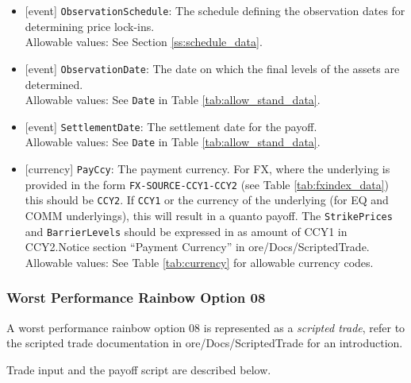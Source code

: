 \begin{itemize}
  Allowable values: See Section \ref{ss:schedule_data} ScheduleData.
  \item{}[event] \lstinline!ObservationSchedule!: The schedule defining the observation dates for determining price lock-ins. \\
  Allowable values: See Section \ref{ss:schedule_data}.
  \item{}[event] \lstinline!ObservationDate!: The date on which the final levels of the assets are determined. \\
  Allowable values: See \lstinline!Date! in Table \ref{tab:allow_stand_data}.
  \item{}[event] \lstinline!SettlementDate!: The settlement date for the payoff. \\
  Allowable values: See \lstinline!Date! in Table \ref{tab:allow_stand_data}.
  \item{}[currency] \lstinline!PayCcy!: The payment currency. For FX, where the underlying is provided
      in the form \lstinline!FX-SOURCE-CCY1-CCY2! (see Table \ref{tab:fxindex_data}) this should
      be \lstinline!CCY2!. If \lstinline!CCY1! or the currency of the underlying (for EQ and
      COMM underlyings), this will result in a quanto payoff. The \lstinline!StrikePrices! and \lstinline!BarrierLevels! should be expressed in
      as amount of CCY1 in CCY2.Notice section ``Payment Currency'' in ore/Docs/ScriptedTrade. \\
        Allowable values: See Table \ref{tab:currency} for allowable currency codes.
\end{itemize}


\subsubsection*{Worst Performance Rainbow Option 08}

A worst performance rainbow option 08 is represented as a {\em scripted trade},
refer to the scripted trade documentation in ore/Docs/ScriptedTrade
for an introduction.

Trade input and the payoff script are described below.

